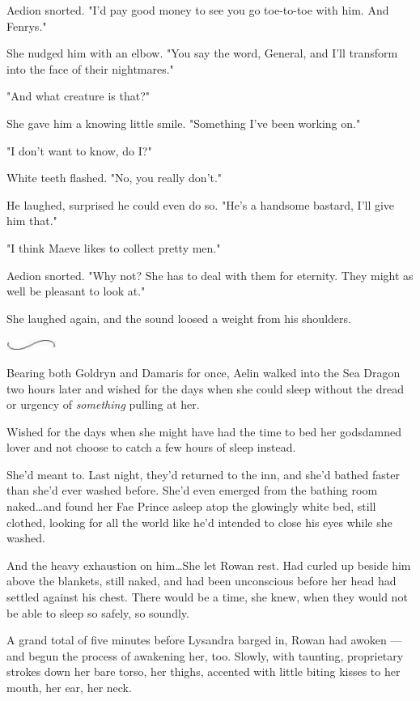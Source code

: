 Aedion snorted.
"I'd pay good money to see you go toe-to-toe with him.
And Fenrys."

She nudged him with an elbow.
"You say the word, General, and I'll transform into the face of their nightmares."

"And what creature is that?"

She gave him a knowing little smile.
"Something I've been working on."

"I don't want to know, do I?"

White teeth flashed.
"No, you really don't."

He laughed, surprised he could even do so.
"He's a handsome bastard, I'll give him that."

"I think Maeve likes to collect pretty men."

Aedion snorted.
"Why not?
She has to deal with them for eternity.
They might as well be pleasant to look at."

She laughed again, and the sound loosed a weight from his shoulders.

\begin{center}
	\includegraphics[width=0.65in,height=0.13in]{images/seperator}
\end{center}

Bearing both Goldryn and Damaris for once, Aelin walked into the Sea Dragon two hours later and wished for the days when she could sleep without the dread or urgency of \emph{something} pulling at her.

Wished for the days when she might have had the time to bed her godsdamned lover and not choose to catch a few hours of sleep instead.

She'd meant to.
Last night, they'd returned to the inn, and she'd bathed faster than she'd ever washed before.
She'd even emerged from the bathing room naked\ldots and found her Fae Prince asleep atop the glowingly white bed, still clothed, looking for all the world like he'd intended to close his eyes while she washed.

And the heavy exhaustion on him\ldots She let Rowan rest.
Had curled up beside him above the blankets, still naked, and had been unconscious before her head had settled against his chest.
There would be a time, she knew, when they would not be able to sleep so safely, so soundly.

A grand total of five minutes before Lysandra barged in, Rowan had awoken ---and begun the process of awakening her, too.
Slowly, with taunting, proprietary strokes down her bare torso, her thighs, accented with little biting kisses to her mouth, her ear, her neck.

